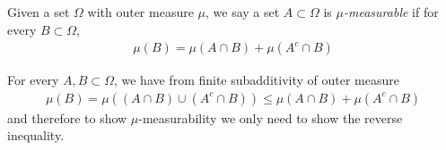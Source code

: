 \begin{defn}Given a set $\Omega$ with outer measure $\mu$, we say a
  set $A \subset \Omega$ is $\mu$\emph{-measurable} if for every $B
  \subset \Omega$,
\begin{align*}
\mu(B) = \mu(A \cap B) + \mu(A^c \cap B)
\end{align*}
\end{defn}

\begin{rem}For every $A,B \subset \Omega$, we have from finite
  subadditivity of outer measure
\begin{align*}
\mu(B) = \mu((A \cap B) \cup (A^c \cap B)) \leq \mu(A \cap B) + \mu(A^c \cap B)
\end{align*}
and therefore to show $\mu$-measurability we only need to show the
reverse inequality.
\end{rem}


